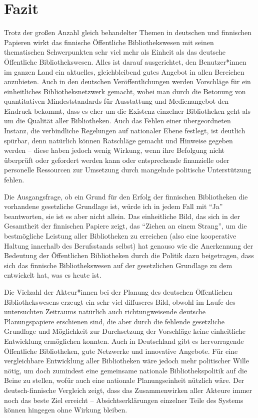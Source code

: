 \documentclass[a4paper,
fontsize=11pt,
oneside,
numbers=noperiodatend,
parskip=half-,
bibliography=totoc,
final
]{scrartcl}
\begin{document}
\hypertarget{fazit}{%
\section{Fazit}\label{fazit}}

Trotz der großen Anzahl gleich behandelter Themen in deutschen und
finnischen Papieren wirkt das finnische Öffentliche Bibliothekswesen mit
seinen thematischen Schwerpunkten sehr viel mehr als Einheit als das
deutsche Öffentliche Bibliothekswesen. Alles ist darauf ausgerichtet,
den Benutzer*innen im ganzen Land ein aktuelles, gleichbleibend gutes
Angebot in allen Bereichen anzubieten. Auch in den deutschen
Veröffentlichungen werden Vorschläge für ein einheitliches
Bibliotheksnetzwerk gemacht, wobei man durch die Betonung von
quantitativen Mindeststandards für Ausstattung und Medienangebot den
Eindruck bekommt, dass es eher um die Existenz einzelner Bibliotheken
geht als um die Qualität aller Bibliotheken. Auch das Fehlen einer
übergeordneten Instanz, die verbindliche Regelungen auf nationaler Ebene
festlegt, ist deutlich spürbar, denn natürlich können Ratschläge gemacht
und Hinweise gegeben werden -- diese haben jedoch wenig Wirkung, wenn
ihre Befolgung nicht überprüft oder gefordert werden kann oder
entsprechende finanzielle oder personelle Ressourcen zur Umsetzung durch
mangelnde politische Unterstützung fehlen.

Die Ausgangsfrage, ob ein Grund für den Erfolg der finnischen
Bibliotheken die vorhandene gesetzliche Grundlage ist, würde ich in
jedem Fall mit \enquote{Ja} beantworten, sie ist es aber nicht allein.
Das einheitliche Bild, das sich in der Gesamtheit der finnischen Papiere
zeigt, das \enquote{Ziehen an einem Strang}, um die bestmögliche
Leistung aller Bibliotheken zu erreichen (also eine kooperative Haltung
innerhalb des Berufsstands selbst) hat genauso wie die Anerkennung der
Bedeutung der Öffentlichen Bibliotheken durch die Politik dazu
beigetragen, dass sich das finnische Bibliothekswesen auf der
gesetzlichen Grundlage zu dem entwickelt hat, was es heute ist.

Die Vielzahl der Akteur*innen bei der Planung des deutschen Öffentlichen
Bibliothekswesens erzeugt ein sehr viel diffuseres Bild, obwohl im Laufe
des untersuchten Zeitraums natürlich auch richtungweisende deutsche
Planungspapiere erschienen sind, die aber durch die fehlende gesetzliche
Grundlage und Möglichkeit zur Durchsetzung der Vorschläge keine
einheitliche Entwicklung ermöglichen konnten. Auch in Deutschland gibt
es hervorragende Öffentliche Bibliotheken, gute Netzwerke und innovative
Angebote. Für eine vergleichbare Entwicklung aller Bibliotheken wäre
jedoch mehr politischer Wille nötig, um doch zumindest eine gemeinsame
nationale Bibliothekspolitik auf die Beine zu stellen, wofür auch eine
nationale Planungseinheit nützlich wäre. Der deutsch-finnische Vergleich
zeigt, dass das Zusammenwirken aller Akteure immer noch das beste Ziel
erreicht -- Absichtserklärungen einzelner Teile des Systems können
hingegen ohne Wirkung bleiben.
\end{document}
